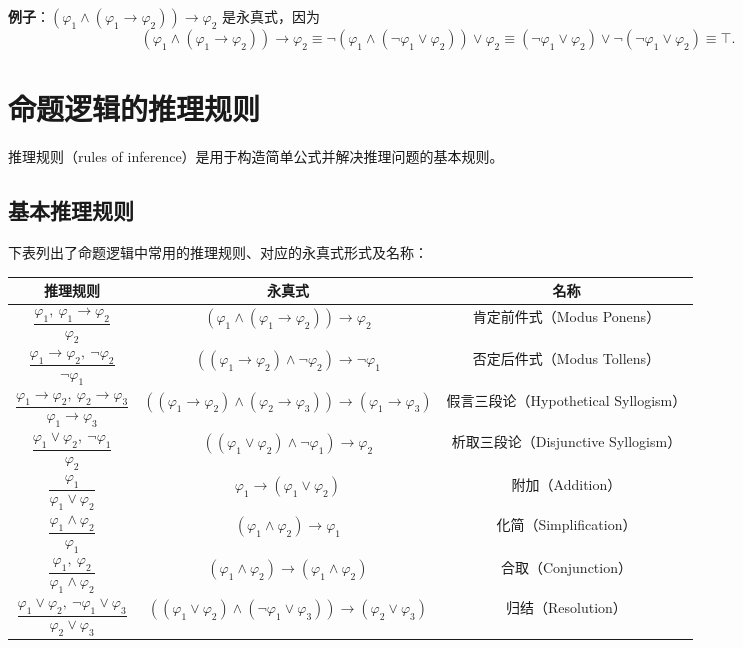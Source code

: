 \documentclass[UTF8,11pt,a4paper]{ctexbook}   %
\theoremstyle{definition}
\begin{document}
\textbf{例子}：$(\varphi_1\land(\varphi_1\to\varphi_2))\to\varphi_2$ 是永真式，因为
\[
(\varphi_1\land(\varphi_1\to\varphi_2))\to\varphi_2\equiv\neg(\varphi_1\land(\neg\varphi_1\lor\varphi_2))\lor\varphi_2\equiv(\neg\varphi_1\lor\varphi_2)\lor\neg(\neg\varphi_1\lor\varphi_2)\equiv\top.
\]

\section{命题逻辑的推理规则}

推理规则（rules of inference）是用于构造简单公式并解决推理问题的基本规则。

\subsection{基本推理规则}

下表列出了命题逻辑中常用的推理规则、对应的永真式形式及名称：

\begin{center}
\small
\begin{tabular}{|c|c|c|}
\hline
\textbf{推理规则} & \textbf{永真式} & \textbf{名称} \\
\hline
$\dfrac{\varphi_1,\ \varphi_1\to\varphi_2}{\varphi_2}$ & $(\varphi_1\land(\varphi_1\to\varphi_2))\to\varphi_2$ & 肯定前件式（Modus Ponens） \\
\hline
$\dfrac{\varphi_1\to\varphi_2,\ \neg\varphi_2}{\neg\varphi_1}$ & $((\varphi_1\to\varphi_2)\land\neg\varphi_2)\to\neg\varphi_1$ & 否定后件式（Modus Tollens） \\
\hline
$\dfrac{\varphi_1\to\varphi_2,\ \varphi_2\to\varphi_3}{\varphi_1\to\varphi_3}$ & $((\varphi_1\to\varphi_2)\land(\varphi_2\to\varphi_3))\to(\varphi_1\to\varphi_3)$ & 假言三段论（Hypothetical Syllogism） \\
\hline
$\dfrac{\varphi_1\lor\varphi_2,\ \neg\varphi_1}{\varphi_2}$ & $((\varphi_1\lor\varphi_2)\land\neg\varphi_1)\to\varphi_2$ & 析取三段论（Disjunctive Syllogism） \\
\hline
$\dfrac{\varphi_1}{\varphi_1\lor\varphi_2}$ & $\varphi_1\to(\varphi_1\lor\varphi_2)$ & 附加（Addition） \\
\hline
$\dfrac{\varphi_1\land\varphi_2}{\varphi_1}$ & $(\varphi_1\land\varphi_2)\to\varphi_1$ & 化简（Simplification） \\
\hline
$\dfrac{\varphi_1,\ \varphi_2}{\varphi_1\land\varphi_2}$ & $(\varphi_1\land\varphi_2)\to(\varphi_1\land\varphi_2)$ & 合取（Conjunction） \\
\hline
$\dfrac{\varphi_1\lor\varphi_2,\ \neg\varphi_1\lor\varphi_3}{\varphi_2\lor\varphi_3}$ & $((\varphi_1\lor\varphi_2)\land(\neg\varphi_1\lor\varphi_3))\to(\varphi_2\lor\varphi_3)$ & 归结（Resolution） \\
\hline
\end{tabular}

\end{center}
\end{document}
